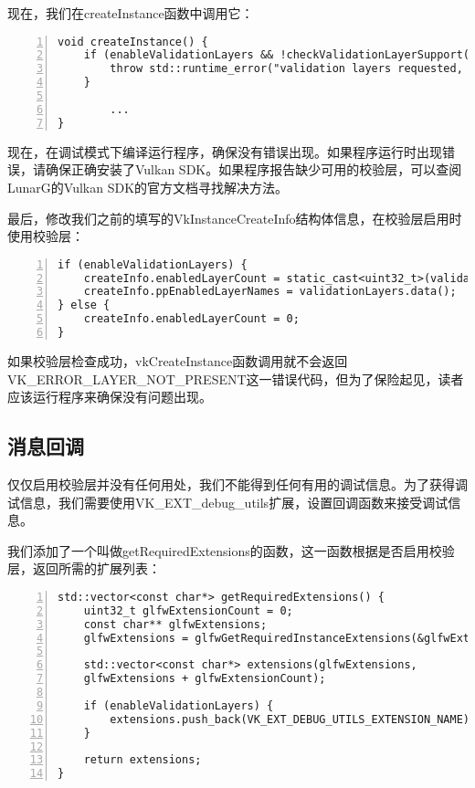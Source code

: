 \documentclass{ctexart}
\begin{document}
现在，我们在createInstance函数中调用它：

\begin{lstlisting}[language={[ANSI]C},keywordstyle=\color{blue!70},commentstyle=\color{red!50!green!50!blue!50},frame=shadowbox, rulesepcolor=\color{red!20!green!20!blue!20},basicstyle=\small,numbers=left, numberstyle=\tiny,breaklines=true]
void createInstance() {
	if (enableValidationLayers && !checkValidationLayerSupport()) {
		throw std::runtime_error("validation layers requested, but not available!");
	}

		...
}
\end{lstlisting}

现在，在调试模式下编译运行程序，确保没有错误出现。如果程序运行时出现错误，请确保正确安装了Vulkan SDK。如果程序报告缺少可用的校验层，可以查阅LunarG的Vulkan SDK的官方文档寻找解决方法。

最后，修改我们之前的填写的VkInstanceCreateInfo结构体信息，在校验层启用时使用校验层：

\begin{lstlisting}[language={[ANSI]C},keywordstyle=\color{blue!70},commentstyle=\color{red!50!green!50!blue!50},frame=shadowbox, rulesepcolor=\color{red!20!green!20!blue!20},basicstyle=\small,numbers=left, numberstyle=\tiny,breaklines=true]
if (enableValidationLayers) {
	createInfo.enabledLayerCount = static_cast<uint32_t>(validationLayers.size());
	createInfo.ppEnabledLayerNames = validationLayers.data();
} else {
	createInfo.enabledLayerCount = 0;
}
\end{lstlisting}

如果校验层检查成功，vkCreateInstance函数调用就不会返回VK\_ERROR\_LAYER\_NOT\_PRESENT这一错误代码，但为了保险起见，读者应该运行程序来确保没有问题出现。

\subsection{消息回调}

仅仅启用校验层并没有任何用处，我们不能得到任何有用的调试信息。为了获得调试信息，我们需要使用VK\_EXT\_debug\_utils扩展，设置回调函数来接受调试信息。

我们添加了一个叫做getRequiredExtensions的函数，这一函数根据是否启用校验层，返回所需的扩展列表：

\begin{lstlisting}[language={[ANSI]C},keywordstyle=\color{blue!70},commentstyle=\color{red!50!green!50!blue!50},frame=shadowbox, rulesepcolor=\color{red!20!green!20!blue!20},basicstyle=\small,numbers=left, numberstyle=\tiny,breaklines=true]
std::vector<const char*> getRequiredExtensions() {
	uint32_t glfwExtensionCount = 0;
	const char** glfwExtensions;
	glfwExtensions = glfwGetRequiredInstanceExtensions(&glfwExtensionCount);

	std::vector<const char*> extensions(glfwExtensions,
	glfwExtensions + glfwExtensionCount);

	if (enableValidationLayers) {
		extensions.push_back(VK_EXT_DEBUG_UTILS_EXTENSION_NAME);
	}

	return extensions;
}
\end{lstlisting}
\end{document}
